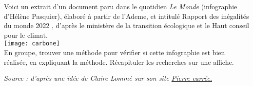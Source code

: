 \Recreation

\smallskip

\begin{enigme}
     Voici un extrait d’un document paru dans le quotidien {\it Le Monde} (infographie d’Hélène Pasquier), élaboré à partir de l’Ademe, et intitulé \og Rapport des inégalités du monde 2022 \fg, d’après le ministère de la transition écologique et le Haut conseil pour le climat. \\ [1mm] 
   \texttt{[image: carbone]} \\ [-3mm]
   
      En groupe, trouver une méthode pour vérifier si cette infographie est bien réalisée, en expliquant la méthode. Récapituler les recherches sur une affiche.
\end{enigme}

\vfill\hfill {\it\small Source : d'après une idée de Claire Lommé sur son site \href{https://clairelommeblog.wordpress.com/category/maths-et-societe}{Pierre carrée.}}


